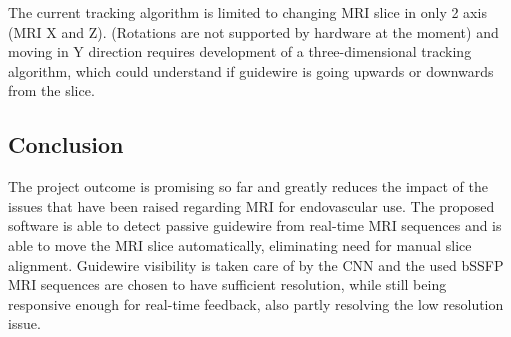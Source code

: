 \documentclass[conference]{IEEEtran}
\begin{document}
 The current tracking algorithm is limited to changing MRI slice in only 2 axis (MRI X and Z). (Rotations are not supported by hardware at the moment) and moving in Y direction requires development of a three-dimensional tracking algorithm, which could understand if guidewire is going upwards or downwards from the slice. 

\subsection{Conclusion}
The project outcome is promising so far and greatly reduces the impact of the issues that have been raised regarding MRI for endovascular use. The proposed software is able to detect passive guidewire from real-time MRI sequences and is able to move the MRI slice automatically, eliminating need for manual slice alignment. Guidewire visibility is taken care of by the CNN and the used bSSFP MRI sequences are chosen to have sufficient resolution, while still being responsive enough for real-time feedback, also partly resolving the low resolution issue.




\vspace{12pt}
\end{document}
